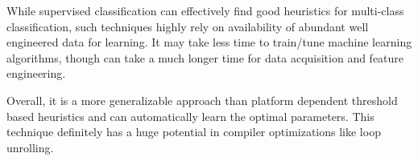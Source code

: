 \documentclass[]{sig-alternate}
\begin{document}
While supervised classification can effectively find good heuristics for multi-class classification, such techniques highly rely on availability of abundant well engineered data for learning. It may take less time to train/tune machine learning algorithms, though can take a much longer time for data acquisition and feature engineering.

Overall, it is a more generalizable approach than platform dependent threshold based heuristics and can automatically learn the optimal parameters. This technique definitely has a huge potential in compiler optimizations like loop unrolling.

%

\begin{scriptsize}
  
\end{scriptsize}
\end{document}

